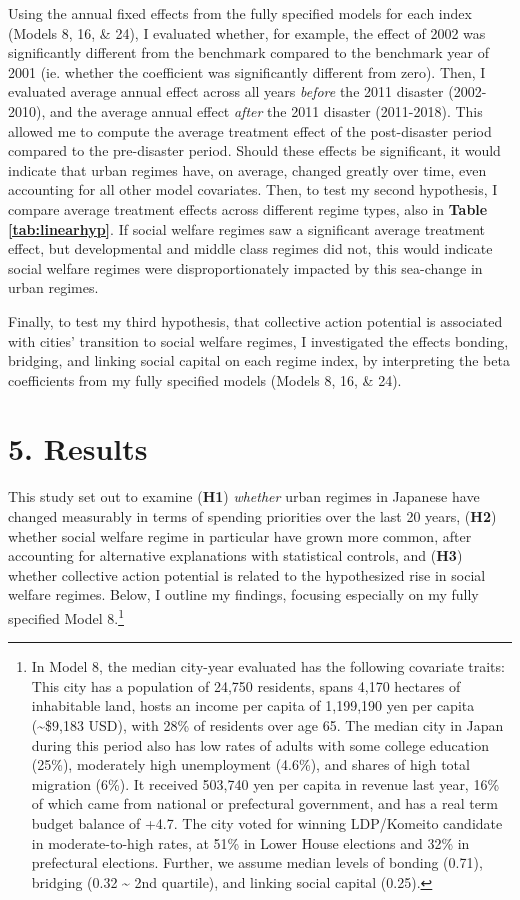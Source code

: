 \documentclass[preprint, 3p,
authoryear]{elsarticle} %
\begin{document}
Using the annual fixed effects from the fully specified models for each
index (Models 8, 16, \& 24), I evaluated whether, for example, the
effect of 2002 was significantly different from the benchmark compared
to the benchmark year of 2001 (ie. whether the coefficient was
significantly different from zero). Then, I evaluated average annual
effect across all years \emph{before} the 2011 disaster (2002-2010), and
the average annual effect \emph{after} the 2011 disaster (2011-2018).
This allowed me to compute the average treatment effect of the
post-disaster period compared to the pre-disaster period. Should these
effects be significant, it would indicate that urban regimes have, on
average, changed greatly over time, even accounting for all other model
covariates. Then, to test my second hypothesis, I compare average
treatment effects across different regime types, also in
\textbf{Table \ref{tab:linearhyp}}. If social welfare regimes saw a
significant average treatment effect, but developmental and middle class
regimes did not, this would indicate social welfare regimes were
disproportionately impacted by this sea-change in urban regimes.

Finally, to test my third hypothesis, that collective action potential
is associated with cities' transition to social welfare regimes, I
investigated the effects bonding, bridging, and linking social capital
on each regime index, by interpreting the beta coefficients from my
fully specified models (Models 8, 16, \& 24).

\hypertarget{results}{%
\section{5. Results}\label{results}}

This study set out to examine (\textbf{H1}) \emph{whether} urban regimes
in Japanese have changed measurably in terms of spending priorities over
the last 20 years, (\textbf{H2}) whether social welfare regime in
particular have grown more common, after accounting for alternative
explanations with statistical controls, and (\textbf{H3}) whether
collective action potential is related to the hypothesized rise in
social welfare regimes. Below, I outline my findings, focusing
especially on my fully specified Model 8.\footnote{In Model 8, the
  median city-year evaluated has the following covariate traits: This
  city has a population of 24,750 residents, spans 4,170 hectares of
  inhabitable land, hosts an income per capita of 1,199,190 yen per
  capita (\textasciitilde\$9,183 USD), with 28\% of residents over age
  65. The median city in Japan during this period also has low rates of
  adults with some college education (25\%), moderately high
  unemployment (4.6\%), and shares of high total migration (6\%). It
  received 503,740 yen per capita in revenue last year, 16\% of which
  came from national or prefectural government, and has a real term
  budget balance of +4.7. The city voted for winning LDP/Komeito
  candidate in moderate-to-high rates, at 51\% in Lower House elections
  and 32\% in prefectural elections. Further, we assume median levels of
  bonding (0.71), bridging (0.32 \textasciitilde{} 2nd quartile), and
  linking social capital (0.25).}
\end{document}
